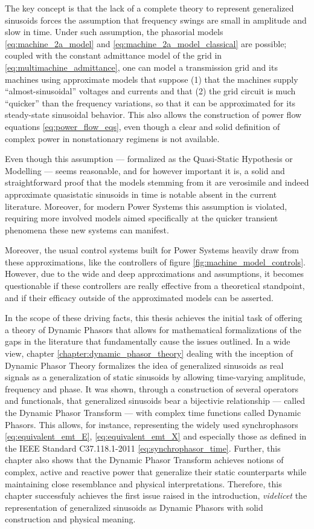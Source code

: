 	The key concept is that the lack of a complete theory to represent generalized sinusoids forces the assumption that frequency swings are small in amplitude and slow in time. Under such assumption, the phasorial models \eqref{eq:machine_2a_model} and \eqref{eq:machine_2a_model_classical} are possible; coupled with the constant admittance model of the grid in \eqref{eq:multimachine_admittance}, one can model a transmission grid and its machines using approximate models that suppose (1) that the machines supply ``almost-sinusoidal'' voltages and currents and that (2) the grid circuit is much ``quicker'' than the frequency variations, so that it can be approximated for its steady-state sinusoidal behavior. This also allows the construction of power flow equations \eqref{eq:power_flow_eqs}, even though a clear and solid definition of complex power in nonstationary regimens is not available.

	Even though this assumption — formalized as the Quasi-Static Hypothesis or Modelling — seems reasonable, and for however important it is, a solid and straightforward proof that the models stemming from it are verosimile and indeed approximate quasistatic sinusoids in time is notable absent in the current literature. Moreover, for modern Power Systems this assumption is violated, requiring more involved models aimed specifically at the quicker transient phenomena these new systems can manifest.

	Moreover, the usual control systems built for Power Systems heavily draw from these approximations, like the controllers of figure \ref{fig:machine_model_controls}. However, due to the wide and deep approximations and assumptions, it becomes questionable if these controllers are really effective from a theoretical standpoint, and if their efficacy outside of the approximated models can be asserted.

	In the scope of these driving facts, this thesis achieves the initial task of offering a theory of Dynamic Phasors that allows for mathematical formalizations of the gaps in the literature that fundamentally cause the issues outlined. In a wide view, chapter \ref{chapter:dynamic_phasor_theory} dealing with the inception of Dynamic Phasor Theory formalizes the idea of generalized sinusoids as real signals as a generalization of static sinusoids by allowing time-varying amplitude, frequency and phase. It was shown, through a construction of several operators and functionals, that generalized sinusoids bear a bijectivie relationship — called the Dynamic Phasor Transform — with complex time functions called Dynamic Phasors. This allows, for instance, representing the widely used synchrophasors \eqref{eq:equivalent_emt_E}, \eqref{eq:equivalent_emt_X} and especially those as defined in the IEEE Standard C37.118.1-2011 \eqref{eq:synchrophasor_time}. Further, this chapter also shows that the Dynamic Phasor Transform achieves notions of complex, active and reactive power that generalize their static counterparts while maintaining close resemblance and physical interpretations. Therefore, this chapter successfuly achieves the first issue raised in the introduction, \textit{videlicet} the representation of generalized sinusoids as Dynamic Phasors with solid construction and physical meaning.

